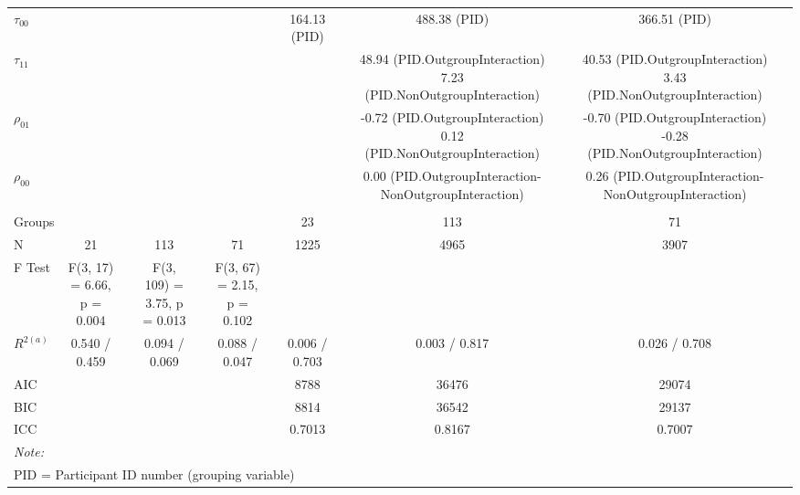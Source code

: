 \begin{landscape}
\begin{table}
\begin{minipage}[t][\textheight][t]{\textwidth}
{\begin{tabular}[t]{lcccccccccccc}
\hspace{1em}$\tau_{00}$ &  &  &  &  &  &  & 164.13 (PID) &  & 488.38 (PID) &  & 366.51 (PID) & \\
\hspace{1em}$\tau_{11}$ &  &  &  &  &  &  &  &  & \makecell[c]{48.94 (PID.OutgroupInteraction)\\ 7.23 (PID.NonOutgroupInteraction)} &  & \makecell[c]{40.53 (PID.OutgroupInteraction)\\ 3.43 (PID.NonOutgroupInteraction)} & \\
\hspace{1em}$\rho_{01}$ &  &  &  &  &  &  &  &  & \makecell[c]{-0.72 (PID.OutgroupInteraction)\\ 0.12 (PID.NonOutgroupInteraction)} &  & \makecell[c]{-0.70 (PID.OutgroupInteraction)\\-0.28 (PID.NonOutgroupInteraction)} & \\
\hspace{1em}$\rho_{00}$ &  &  &  &  &  &  &  &  & 0.00 (PID.OutgroupInteraction-NonOutgroupInteraction) &  & 0.26 (PID.OutgroupInteraction-NonOutgroupInteraction) & \\
\addlinespace[0.3em]
\multicolumn{13}{l}{\textbf{Fit}}\\
\hspace{1em}Groups &  &  &  &  &  &  & 23 &  & 113 &  & 71 & \\
\hspace{1em}N & 21 &  & 113 &  & 71 &  & 1225 &  & 4965 &  & 3907 & \\
\hspace{1em}F Test & F(3, 17) = 6.66, p =  0.004 &  & F(3, 109) = 3.75, p =  0.013 &  & F(3, 67) = 2.15, p =  0.102 &  &  &  &  &  &  & \\
\hspace{1em}$R^{2 (a)}$ & 0.540 / 0.459 &  & 0.094 / 0.069 &  & 0.088 / 0.047 &  & 0.006 / 0.703 &  & 0.003 / 0.817 &  & 0.026 / 0.708 & \\
\hspace{1em}AIC &  &  &  &  &  &  & 8788 &  & 36476 &  & 29074 & \\
\hspace{1em}BIC &  &  &  &  &  &  & 8814 &  & 36542 &  & 29137 & \\
\hspace{1em}ICC &  &  &  &  &  &  & 0.7013 &  & 0.8167 &  & 0.7007 & \\
\bottomrule
\multicolumn{13}{l}{\rule{0pt}{1em}\textit{Note: }}\\
\multicolumn{13}{l}{\rule{0pt}{1em}PID = Participant ID number (grouping variable)}\\

\end{tabular}}
\end{minipage}
\end{table}
\end{landscape}
